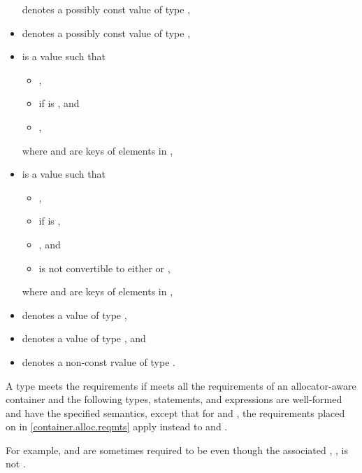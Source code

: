 \begin{itemize}
 denotes a possibly const value of type ,
\item
{} denotes a possibly const value of type ,
\item
{} is a value such that
  \begin{itemize}
  \item {},
  \item {} if  is , and
  \item {},
  \end{itemize}
  where  and  are keys of elements in ,
\item
{} is a value such that
  \begin{itemize}
  \item {},
  \item {} if  is ,
  \item {}, and
  \item {} is not convertible to
    either  or ,
  \end{itemize}
  where  and  are keys of elements in ,
\item
{} denotes a value of type ,
\item
{} denotes a value of type , and
\item
{} denotes a non-const rvalue of type .
\end{itemize}

\pnum
A type  meets
the  requirements
if  meets all the requirements of
an allocator-aware container and
the following types, statements, and expressions are well-formed and
have the specified semantics,
except that for  and ,
the requirements placed on  in \ref{container.alloc.reqmts}
apply instead to  and .
\begin{note}
For example,  and 
are sometimes required to be 
even though the associated ,
,
is not .
\end{note}

